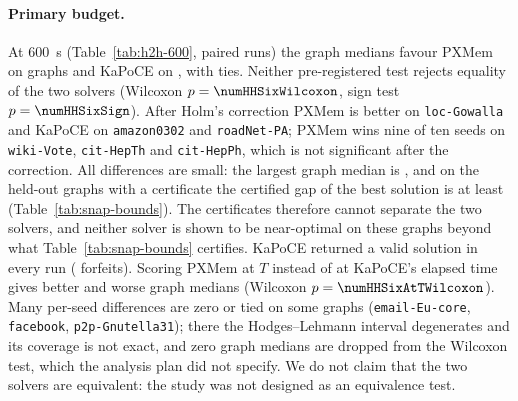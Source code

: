 \begin{table}[!tbp]
\centering
\caption{PXMem against KaPoCE on the twelve held-out SNAP graphs,
$T=\SI{600}{s}$ (primary budget), ten seeds per graph.  W/T/L: runs in
which PXMem is better, equal, worse.  median, HL: median and Hodges--Lehmann
estimate of $(\cost_{\mathrm{PXMem}}-\cost_{\mathrm{KaPoCE}})/
\cost_{\mathrm{KaPoCE}}$ in percent, negative when PXMem is better, with the
exact $95\%$ confidence interval; $p$: exact sign test over the seeds;
$p_{\mathrm{Holm}}$: Holm-adjusted over the twelve graphs.  Last row: the
pre-registered tests over the twelve graph medians.}
\label{tab:h2h-600}
\footnotesize
\setlength{\tabcolsep}{4pt}

\end{table}

\begin{table}[!tbp]
\centering
\caption{As Table~\ref{tab:h2h-600}, $T=\SI{150}{s}$.}
\label{tab:h2h-150}
\footnotesize
\setlength{\tabcolsep}{4pt}

\end{table}

\begin{table}[!tbp]
\centering
\caption{As Table~\ref{tab:h2h-600}, $T=\SI{60}{s}$.}
\label{tab:h2h-60}
\footnotesize
\setlength{\tabcolsep}{4pt}

\end{table}

\paragraph{Primary budget.}  At \SI{600}{s} (Table~\ref{tab:h2h-600},
\numHHSixRuns{} paired runs) the graph medians favour PXMem on
\numHHSixBetter{} graphs and KaPoCE on \numHHSixWorse{}, with
\numHHSixEqual{} ties.  Neither pre-registered test rejects equality of the
two solvers (Wilcoxon $p=\numHHSixWilcoxon$, sign test
$p=\numHHSixSign$).  After Holm's correction PXMem is better on
\texttt{loc-Gowalla} and KaPoCE on \texttt{amazon0302} and
\texttt{roadNet-PA}; PXMem wins nine of ten seeds on \texttt{wiki-Vote},
\texttt{cit-HepTh} and \texttt{cit-HepPh}, which is not significant after the
correction.  All differences are small: the largest graph median is
\numHHSixMaxAbs{}, and on the held-out graphs with a certificate the
certified gap of the best solution is at least \numSnapGapMinHeld{}
(Table~\ref{tab:snap-bounds}).  The certificates therefore cannot separate
the two solvers, and neither solver is shown to be near-optimal on these
graphs beyond what Table~\ref{tab:snap-bounds} certifies.  KaPoCE returned a
valid solution in every run (\numHHSixForfeitK{} forfeits).  Scoring PXMem at
$T$ instead of at KaPoCE's elapsed time gives \numHHSixAtTBetter{} better and
\numHHSixAtTWorse{} worse graph medians (Wilcoxon $p=\numHHSixAtTWilcoxon$).
Many per-seed differences are zero or tied on some graphs
(\texttt{email-Eu-core}, \texttt{facebook}, \texttt{p2p-Gnutella31}); there
the Hodges--Lehmann interval degenerates and its coverage is not exact, and
zero graph medians are dropped from the Wilcoxon test, which the analysis
plan did not specify.  We do not claim that the two solvers are
equivalent: the study was not designed as an equivalence test.

